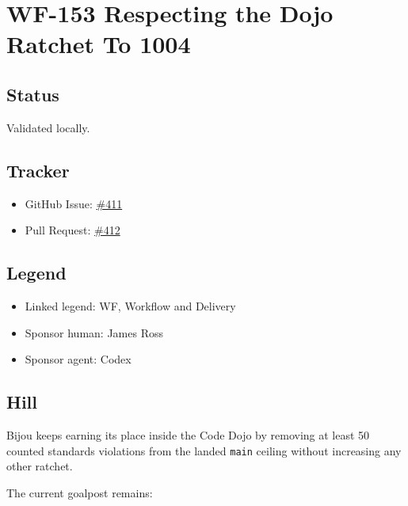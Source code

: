 \chapter{WF-153 Respecting the Dojo Ratchet To 1004}\label{record-235}

\smallskip

\section{Status}\label{record-235-status}

Validated locally.

\section{Tracker}\label{record-235-tracker}

\begin{itemize}
\tightlist
\item
  GitHub Issue: \href{https://github.com/flyingrobots/bijou/issues/411}{\#411}
\item
  Pull Request: \href{https://github.com/flyingrobots/bijou/pull/412}{\#412}
\end{itemize}

\section{Legend}\label{record-235-legend}

\begin{itemize}
\tightlist
\item
  Linked legend: WF, Workflow and Delivery
\item
  Sponsor human: James Ross
\item
  Sponsor agent: Codex
\end{itemize}

\section{Hill}\label{record-235-hill}

Bijou keeps earning its place inside the Code Dojo by removing at least 50 counted standards violations from the landed \texttt{m\allowbreak{}a\allowbreak{}i\allowbreak{}n} ceiling without increasing any other ratchet.

The current goalpost remains:


